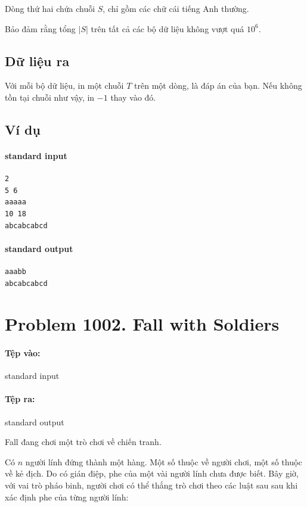 \documentclass[11pt]{article}
\begin{document}
Dòng thứ hai chứa chuỗi \(S\), chỉ gồm các chữ cái tiếng Anh thường.

Bảo đảm rằng tổng \(|S|\) trên tất cả các bộ dữ liệu không vượt quá \(10^6\).

\subsection*{Dữ liệu ra}

Với mỗi bộ dữ liệu, in một chuỗi \(T\) trên một dòng, là đáp án của bạn. Nếu
không tồn tại chuỗi như vậy, in \(-1\) thay vào đó.

\subsection*{Ví dụ}

\paragraph{standard input}
\begin{verbatim}
2
5 6
aaaaa
10 18
abcabcabcd
\end{verbatim}

\paragraph{standard output}
\begin{verbatim}
aaabb
abcabcabcd
\end{verbatim}

\section{Problem 1002. Fall with Soldiers}

\paragraph{Tệp vào:} standard input
\paragraph{Tệp ra:} standard output

Fall đang chơi một trò chơi về chiến tranh.

Có \(n\) người lính đứng thành một hàng. Một số thuộc về người chơi, một số
thuộc về kẻ địch. Do có gián điệp, phe của một vài người lính chưa được biết.
Bây giờ, với vai trò pháo binh, người chơi có thể thắng trò chơi theo các
luật sau sau khi xác định phe của từng người lính:
\end{document}
